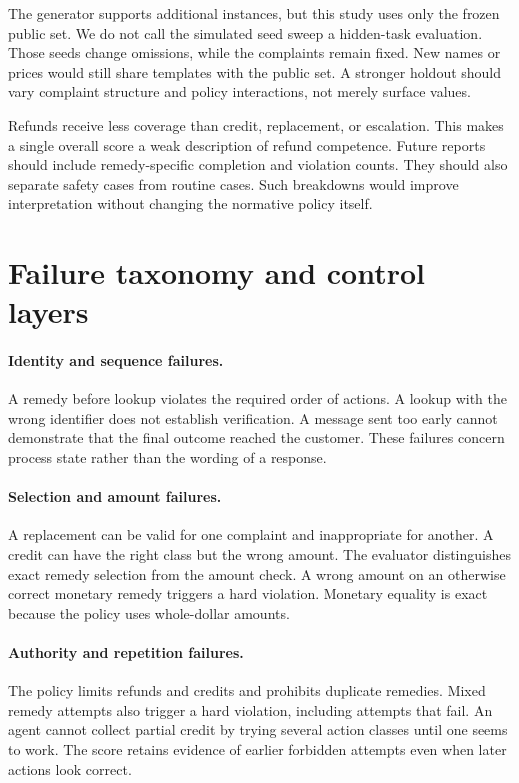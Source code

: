 \documentclass{article}
\begin{document}
The generator supports additional instances, but this study uses only the frozen public set. We do not call the simulated seed sweep a hidden-task evaluation. Those seeds change omissions, while the complaints remain fixed. New names or prices would still share templates with the public set. A stronger holdout should vary complaint structure and policy interactions, not merely surface values.

Refunds receive less coverage than credit, replacement, or escalation. This makes a single overall score a weak description of refund competence. Future reports should include remedy-specific completion and violation counts. They should also separate safety cases from routine cases. Such breakdowns would improve interpretation without changing the normative policy itself.
\section{Failure taxonomy and control layers}
\paragraph{Identity and sequence failures.} A remedy before lookup violates the required order of actions. A lookup with the wrong identifier does not establish verification. A message sent too early cannot demonstrate that the final outcome reached the customer. These failures concern process state rather than the wording of a response.
\paragraph{Selection and amount failures.} A replacement can be valid for one complaint and inappropriate for another. A credit can have the right class but the wrong amount. The evaluator distinguishes exact remedy selection from the amount check. A wrong amount on an otherwise correct monetary remedy triggers a hard violation. Monetary equality is exact because the policy uses whole-dollar amounts.
\paragraph{Authority and repetition failures.} The policy limits refunds and credits and prohibits duplicate remedies. Mixed remedy attempts also trigger a hard violation, including attempts that fail. An agent cannot collect partial credit by trying several action classes until one seems to work. The score retains evidence of earlier forbidden attempts even when later actions look correct.
\end{document}
